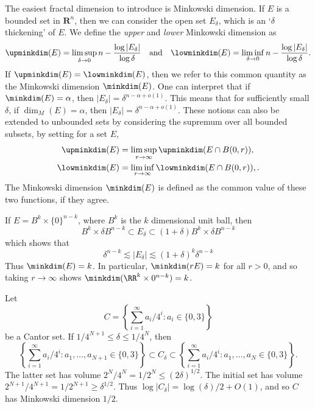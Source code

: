 The easiest fractal dimension to introduce is Minkowski dimension. If $E$ is a bounded set in $\mathbf{R}^n$, then we can consider the open set $E_\delta$, which is an `$\delta$ thickening' of $E$. We define the \emph{upper} and \emph{lower} Minkowski dimension as
%
\[ \upminkdim(E) = \limsup_{\delta \to 0} n - \frac{\log|E_\delta|}{\log \delta}\quad\text{and}\quad \lowminkdim(E) = \liminf_{\delta \to 0} n - \frac{\log|E_\delta|}{\log \delta}. \]
%
If $\upminkdim(E) = \lowminkdim(E)$, then we refer to this common quantity as the Minkowski dimension $\minkdim(E)$. One can interpret that if $\minkdim(E) = \alpha$, then $|E_\delta| = \delta^{n - \alpha + o(1)}$. This means that for sufficiently small $\delta$, if $\dim_M(E) = \alpha$, then $|E_\delta| = \delta^{n - \alpha + o(1)}$. These notions can also be extended to unbounded sets by considering the supremum over all bounded subsets, by setting for a set $E$,
%
\begin{align*}
	\upminkdim(E) &= \limsup_{r \to \infty} \upminkdim(E \cap B(0,r)),\\
	\lowminkdim(E) &= \liminf_{r \to \infty} \lowminkdim(E \cap B(0,r)),.
\end{align*}
%
The Minkowski dimension $\minkdim(E)$ is defined as the common value of these two functions, if they agree.

\begin{example}
	If $E = B^k \times \{ 0 \}^{n-k}$, where $B^k$ is the $k$ dimensional unit ball, then
	\[ B^k \times \delta B^{n-k} \subset E_\delta \subset (1 + \delta)B^k \times \delta B^{n-k} \]
	which shows that
	\[ \delta^{n-k} \lesssim |E_\delta| \lesssim (1 + \delta)^k \delta^{n-k} \]
	Thus $\minkdim(E) = k$. In particular, $\minkdim(r E) = k$ for all $r > 0$, and so taking $r \to \infty$ shows $\minkdim(\RR^k \times 0^{n-k}) = k$.
\end{example}

\begin{example}
	Let
	\[ C = \left\{ \sum_{i = 1}^\infty a_i/4^i : a_i \in \{ 0, 3 \} \right\} \]
	be a Cantor set. If $1/4^{N+1} \leq \delta \leq 1/4^N$, then
	\[ \left\{ \sum_{i = 1}^\infty a_i/4^i : a_1, \dots, a_{N+1} \in \{ 0, 3 \} \right\} \subset C_\delta \subset \left\{ \sum_{i = 1}^\infty a_i/4^i : a_1, \dots, a_N \in \{ 0, 3 \} \right\}. \]
	The latter set has volume $2^N/4^N = 1/2^N \leq (2\delta)^{1/2}$. The initial set has volume $2^{N+1}/4^{N+1} = 1/2^{N+1} \geq \delta^{1/2}$. Thus $\log |C_\delta| = \log(\delta) / 2 + O(1)$, and so $C$ has Minkowski dimension $1/2$.
\end{example}

